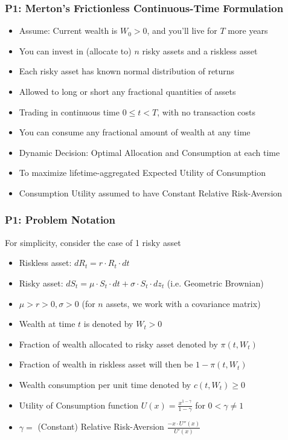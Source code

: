 \documentclass[handout]{beamer}
\begin{document}
\begin{frame}
\frametitle{P1: Merton's Frictionless Continuous-Time Formulation}
\pause
\begin{itemize}[<+->]
\item Assume: Current wealth is $W_0 > 0$, and you'll live for $T$ more years
\item You can invest in (allocate to) $n$ risky assets and a riskless asset
\item Each risky asset has known normal distribution of returns
\item Allowed to long or short any fractional quantities of assets
\item Trading in continuous time $0 \leq t < T$, with no transaction costs
\item You can consume any fractional amount of wealth at any time
\item Dynamic Decision: Optimal Allocation and Consumption at each time
\item To maximize lifetime-aggregated Expected Utility of Consumption
\item Consumption Utility assumed to have Constant Relative Risk-Aversion
\end{itemize}
\end{frame}

\begin{frame}
\frametitle{P1: Problem Notation}
For simplicity, consider the case of 1 risky asset
\pause
\begin{itemize}[<+->]
\item Riskless asset: $dR_t = r \cdot R_t \cdot dt$
\item Risky asset: $dS_t = \mu \cdot S_t \cdot dt + \sigma \cdot S_t \cdot dz_t$ (i.e. Geometric Brownian)
\item $\mu > r > 0, \sigma > 0$ (for $n$ assets, we work with a covariance matrix)
\item Wealth at time $t$ is denoted by $W_t > 0$
\item Fraction of wealth allocated to risky asset denoted by $\pi(t, W_t)$
\item Fraction of wealth in riskless asset will then be $1 - \pi(t, W_t)$
\item Wealth consumption per unit time denoted by $c(t, W_t) \geq 0$
\item Utility of Consumption function $U(x) = \frac {x^{1-\gamma}} {1 - \gamma}$ for $0 < \gamma \neq 1$
\item $\gamma =$ (Constant) Relative Risk-Aversion $\frac {-x \cdot U''(x)} {U'(x)}$
\end{itemize}
\end{frame}
\end{document}
